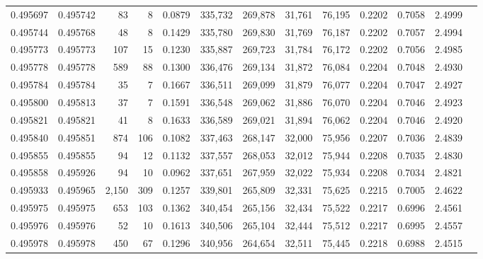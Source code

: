 \begin{tabular}{rrrrrrrrrrrrr}
0.495697 & 0.495742 &    83 &     8 &                                     0.0879 & 335,732 & 269,878 &  31,761 &  76,195 & 0.2202 & 0.7058 & 2.4999 \\
0.495744 & 0.495768 &    48 &     8 &                                     0.1429 & 335,780 & 269,830 &  31,769 &  76,187 & 0.2202 & 0.7057 & 2.4994 \\
0.495773 & 0.495773 &   107 &    15 &                                     0.1230 & 335,887 & 269,723 &  31,784 &  76,172 & 0.2202 & 0.7056 & 2.4985 \\
0.495778 & 0.495778 &   589 &    88 &                                     0.1300 & 336,476 & 269,134 &  31,872 &  76,084 & 0.2204 & 0.7048 & 2.4930 \\
0.495784 & 0.495784 &    35 &     7 &                                     0.1667 & 336,511 & 269,099 &  31,879 &  76,077 & 0.2204 & 0.7047 & 2.4927 \\
0.495800 & 0.495813 &    37 &     7 &                                     0.1591 & 336,548 & 269,062 &  31,886 &  76,070 & 0.2204 & 0.7046 & 2.4923 \\
0.495821 & 0.495821 &    41 &     8 &                                     0.1633 & 336,589 & 269,021 &  31,894 &  76,062 & 0.2204 & 0.7046 & 2.4920 \\
0.495840 & 0.495851 &   874 &   106 &                                     0.1082 & 337,463 & 268,147 &  32,000 &  75,956 & 0.2207 & 0.7036 & 2.4839 \\
0.495855 & 0.495855 &    94 &    12 &                                     0.1132 & 337,557 & 268,053 &  32,012 &  75,944 & 0.2208 & 0.7035 & 2.4830 \\
0.495858 & 0.495926 &    94 &    10 &                                     0.0962 & 337,651 & 267,959 &  32,022 &  75,934 & 0.2208 & 0.7034 & 2.4821 \\
0.495933 & 0.495965 & 2,150 &   309 &                                     0.1257 & 339,801 & 265,809 &  32,331 &  75,625 & 0.2215 & 0.7005 & 2.4622 \\
0.495975 & 0.495975 &   653 &   103 &                                     0.1362 & 340,454 & 265,156 &  32,434 &  75,522 & 0.2217 & 0.6996 & 2.4561 \\
0.495976 & 0.495976 &    52 &    10 &                                     0.1613 & 340,506 & 265,104 &  32,444 &  75,512 & 0.2217 & 0.6995 & 2.4557 \\
0.495978 & 0.495978 &   450 &    67 &                                     0.1296 & 340,956 & 264,654 &  32,511 &  75,445 & 0.2218 & 0.6988 & 2.4515 \\

\end{tabular}
